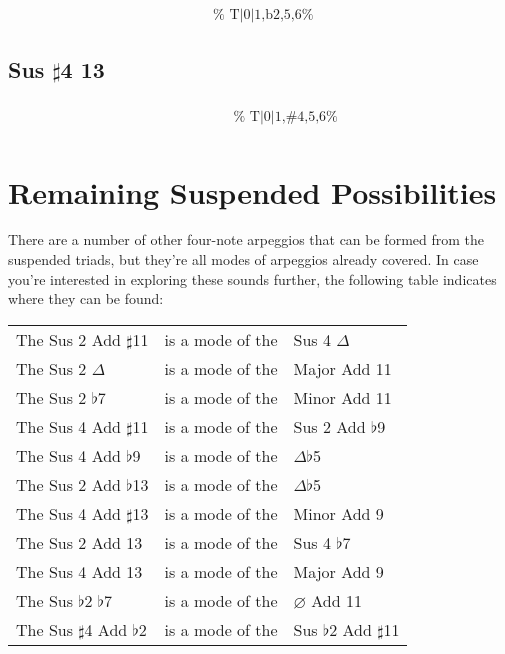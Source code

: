 \documentclass[english]{./gbook}
\begin{document}
\begin{large}
\[\begin{array}{ll}
&
	\text{
	}
\end{array}
\]

\subsection*{Sus $\sharp$4 13}

\[
\begin{array}{ll}
	\begin{array}{c}
		\begin{array}{ccc}
			&%
			&%
		\end{array}
		\\
		\begin{array}{cc}
			&%
		\end{array}
	\end{array}

&
	\text{
	}
\end{array}
\]

\section{Remaining Suspended Possibilities}

There are a number of other four-note arpeggios that can be formed from the suspended triads, but they're all modes of arpeggios already covered. In case you're interested in exploring these sounds further, the following table indicates where they can be found:

\begin{tabular}{lll}
	The Sus 2 Add $\sharp$11 &is a mode of the& Sus 4 $\Delta$ \\
	The Sus 2 $\Delta$ &is a mode of the& Major Add 11\\
	The Sus 2 $\flat$7 &is a mode of the& Minor Add 11\\
	The Sus 4 Add $\sharp$11 &is a mode of the& Sus 2 Add $\flat$9 \\
	The Sus 4 Add $\flat$9 &is a mode of the& $\Delta\flat$5\\
	The Sus 2 Add $\flat$13 &is a mode of the& $\Delta\flat$5\\
	The Sus 4 Add $\sharp$13 &is a mode of the& Minor Add 9\\
	The Sus 2 Add 13 &is a mode of the& Sus 4 $\flat$7\\
	The Sus 4 Add 13 &is a mode of the& Major Add 9\\
	The Sus $\flat$2 $\flat$7 &is a mode of the& $\varnothing$ Add 11 \\
	The Sus $\sharp$4 Add $\flat$2 &is a mode of the& Sus $\flat$2 Add $\sharp$11
\end{tabular}


\end{large}
\end{document}
